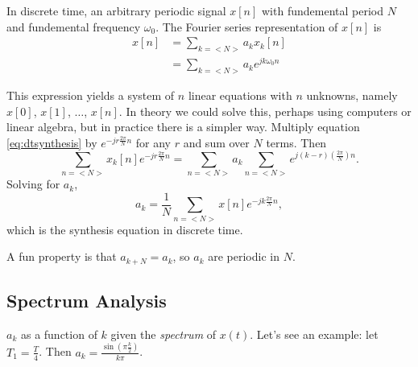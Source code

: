In discrete time, an arbitrary periodic signal $x[n]$ with fundemental
period $N$ and fundemental frequency $\omega_0$. The Fourier series
representation of $x[n]$ is
\begin{align}\label{eq:dtsynthesis}
    x[n] & = \sum_{k=<N>} a_k x_k[n]           \\
         & = \sum_{k=<N>} a_k e^{jk\omega_0 n}
\end{align}

This expression yields a system of $n$ linear equations with $n$
unknowns, namely $x[0]$, $x[1]$, $\dots$, $x[n]$. In theory we
could solve this, perhaps using computers or linear algebra, but
in practice there is a simpler way. Multiply equation \ref{eq:dtsynthesis}
by $e^{-jr\frac{2\pi}{N}n}$ for any $r$ and sum over $N$ terms. Then
\begin{equation}
    \sum_{n=<N>} x_k[n] e^{-jr\frac{2\pi}{N}n} = \sum_{n=<N>} a_k \sum_{n=<N>} e^{j(k-r)(\frac{2\pi}{N})n}.
\end{equation}
Solving for $a_k$,
\begin{equation}
    a_k = \frac{1}{N} \sum_{n=<N>} x[n] e^{-jk\frac{2\pi}{N}n},
\end{equation}
which is the synthesis equation in discrete time.

A fun property is that $a_{k+N} = a_k$, so $a_k$ are periodic in $N$.

\subsection{Spectrum Analysis}

$a_k$ as a function of $k$ given the \emph{spectrum} of $x(t)$. Let's see
an example: let $T_1 = \frac{T}{4}$. Then $a_k = \frac{\sin(\pi \frac{k}{2})}{k\pi}$.


